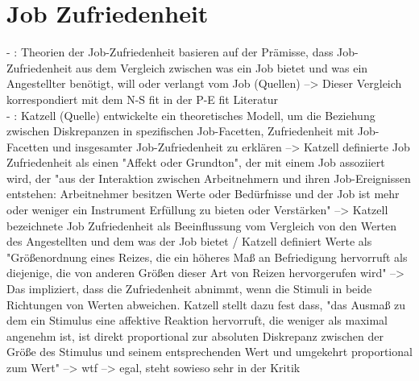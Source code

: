 \section{Job Zufriedenheit}
\label{ch:notizen:jobZufriedenheit}
- \cite[S. 9]{edwards:2008}: Theorien der Job-Zufriedenheit basieren auf der Prämisse, dass Job-Zufriedenheit aus dem Vergleich zwischen was ein Job bietet und was ein Angestellter benötigt, will oder verlangt vom Job (Quellen) --> Dieser Vergleich korrespondiert mit dem N-S fit in der P-E fit Literatur \\
- \cite[S. 10]{edwards:2008}: Katzell (Quelle) entwickelte ein theoretisches Modell, um die Beziehung zwischen Diskrepanzen in spezifischen Job-Facetten, Zufriedenheit mit Job-Facetten und insgesamter Job-Zufriedenheit zu erklären --> Katzell definierte Job Zufriedenheit als einen "Affekt oder Grundton", der mit einem Job assoziiert wird, der "aus der Interaktion zwischen Arbeitnehmern und ihren Job-Ereignissen entstehen: Arbeitnehmer besitzen Werte oder Bedürfnisse und der Job ist mehr oder weniger ein Instrument Erfüllung zu bieten oder Verstärken" --> Katzell bezeichnete Job Zufriedenheit als Beeinflussung vom Vergleich von den Werten des Angestellten und dem was der Job bietet / Katzell definiert Werte als "Größenordnung eines Reizes, die ein höheres Maß an Befriedigung hervorruft als diejenige, die von anderen Größen dieser Art von Reizen hervorgerufen wird" --> Das impliziert, dass die Zufriedenheit abnimmt, wenn die Stimuli in beide Richtungen von Werten abweichen. Katzell stellt dazu fest dass, "das Ausmaß zu dem ein Stimulus eine affektive Reaktion hervorruft, die weniger als maximal angenehm ist, ist direkt proportional zur absoluten Diskrepanz zwischen der Größe des Stimulus und seinem entsprechenden Wert und umgekehrt proportional zum Wert" --> wtf --> egal, steht sowieso sehr in der Kritik \\
